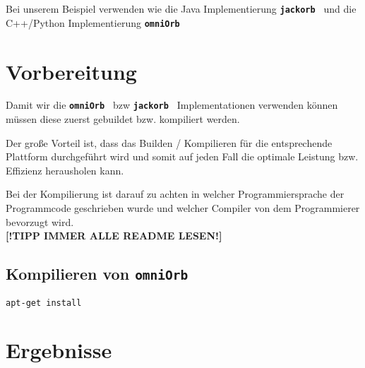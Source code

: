 	Bei unserem Beispiel verwenden wie die Java Implementierung \textbf{\texttt{jackorb \cite{jackorb}}} und die C++/Python Implementierung \textbf{\texttt{omniOrb \cite{omniOrb}}}
	
	\clearpage
	
\section{Vorbereitung \cite{ubuntuCompile}}
Damit wir die \textbf{\texttt{omniOrb \cite{omniOrb}}} bzw \textbf{\texttt{jackorb \cite{jackorb}}} Implementationen verwenden können müssen diese zuerst gebuildet bzw. kompiliert werden.

Der große Vorteil ist, dass das Builden / Kompilieren für die entsprechende Plattform durchgeführt wird und somit auf jeden Fall die optimale Leistung bzw. Effizienz herausholen kann.

Bei der Kompilierung ist darauf zu achten in welcher Programmiersprache der Programmcode geschrieben wurde und welcher Compiler von dem Programmierer bevorzugt wird.\\
\textbf{[!TIPP IMMER ALLE README LESEN!]}

\subsection{Kompilieren von \texttt{omniOrb \cite{omniOrb}}}

\begin{lstlisting}[style=BashInputStyle, caption=Implizite Transaktion]
apt-get install
\end{lstlisting}

\clearpage

\section{Ergebnisse}
\label{sec:Ergebnisse}